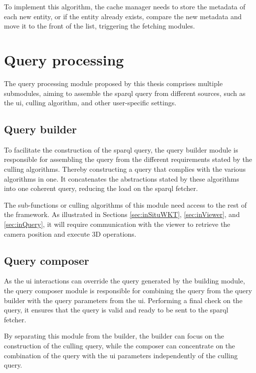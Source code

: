 To implement this algorithm, the cache manager needs to store the metadata of each new entity, or if the entity already exists, compare the new metadata and move it to the front of the list, triggering the fetching modules.

\section{Query processing}
The query processing module proposed by this thesis comprises multiple submodules, aiming to assemble the \ac{sparql} query from different sources, such as the \ac{ui}, culling algorithm, and other user-specific settings.

\subsection{Query builder}
To facilitate the construction of the \ac{sparql} query, the query builder module is responsible for assembling the query from the different requirements stated by the culling algorithms. Thereby constructing a query that complies with the various algorithms in one. It concatenates the abstractions stated by these algorithms into one coherent query, reducing the load on the \ac{sparql} fetcher.

The sub-functions or culling algorithms of this module need access to the rest of the framework. As illustrated in Sections \ref{sec:inSituWKT}, \ref{sec:inViewer}, and \ref{sec:inQuery}, it will require communication with the viewer to retrieve the camera position and execute 3D operations.

\subsection{Query composer}
As the \ac{ui} interactions can override the query generated by the building module, the query composer module is responsible for combining the query from the query builder with the query parameters from the \ac{ui}. Performing a final check on the query, it ensures that the query is valid and ready to be sent to the \ac{sparql} fetcher.

By separating this module from the builder, the builder can focus on the construction of the culling query, while the composer can concentrate on the combination of the query with the \ac{ui} parameters independently of the culling query.

